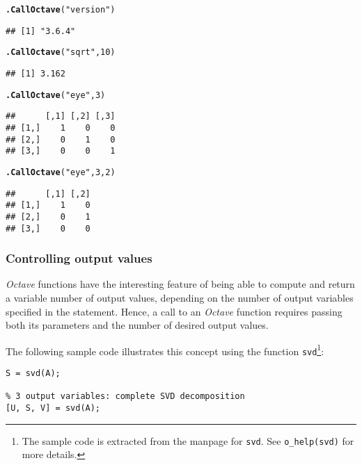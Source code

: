 \documentclass[english,10pt,a4paper]{article}\usepackage{graphicx, color}
\makeatletter
\newcommand{\hlfunctioncall}[1]{\textcolor[rgb]{0.501960784313725,0,0.329411764705882}{\textbf{#1}}}%
\newcommand{\hlstring}[1]{\textcolor[rgb]{0.6,0.6,1}{#1}}%
\newenvironment{kframe}{%
 \def\at@end@of@kframe{}%
 \ifinner\ifhmode%
  \def\at@end@of@kframe{\end{minipage}}%
  \begin{minipage}{\columnwidth}%
 \fi\fi%
 \def\FrameCommand##1{\hskip\@totalleftmargin \hskip-\fboxsep
 \colorbox{shadecolor}{##1}\hskip-\fboxsep
     \hskip-\linewidth \hskip-\@totalleftmargin \hskip\columnwidth}%
 \MakeFramed {\advance\hsize-\width
   \@totalleftmargin\z@ \linewidth\hsize
   \@setminipage}}%
 {\par\unskip\endMakeFramed%
 \at@end@of@kframe}
\newenvironment{knitrout}{}{} %
\let\proglang=\textit
\let\code=\texttt
\newcommand{\octave}{\proglang{Octave}\xspace}
\makeatother
\begin{document}
\begin{knitrout}
\color{fgcolor}\begin{kframe}
\begin{alltt}
\hlfunctioncall{.CallOctave}(\hlstring{"version"})
\end{alltt}
\begin{verbatim}
## [1] "3.6.4"
\end{verbatim}
\begin{alltt}
\hlfunctioncall{.CallOctave}(\hlstring{"sqrt"}, 10)
\end{alltt}
\begin{verbatim}
## [1] 3.162
\end{verbatim}
\begin{alltt}
\hlfunctioncall{.CallOctave}(\hlstring{"eye"}, 3)
\end{alltt}
\begin{verbatim}
##      [,1] [,2] [,3]
## [1,]    1    0    0
## [2,]    0    1    0
## [3,]    0    0    1
\end{verbatim}
\begin{alltt}
\hlfunctioncall{.CallOctave}(\hlstring{"eye"}, 3, 2)
\end{alltt}
\begin{verbatim}
##      [,1] [,2]
## [1,]    1    0
## [2,]    0    1
## [3,]    0    0
\end{verbatim}
\end{kframe}
\end{knitrout}


\subsubsection{Controlling output values}
\label{sec:argout}

\octave functions have the interesting feature of being able to compute
and return a variable number of output values, depending on the number of output
variables specified in the statement.
Hence, a call to an \octave function requires passing both its parameters and
the number of desired output values.

The following sample code illustrates this concept using the function
\code{svd}\footnote{The sample code is extracted from the manpage for
\code{svd}. See \code{o\_help(svd)} for more details.}:

\begin{Verbatim}[frame=single]
% single output variable: eigen values only
S = svd(A);

% 3 output variables: complete SVD decomposition  
[U, S, V] = svd(A);
\end{Verbatim}
\end{document}
